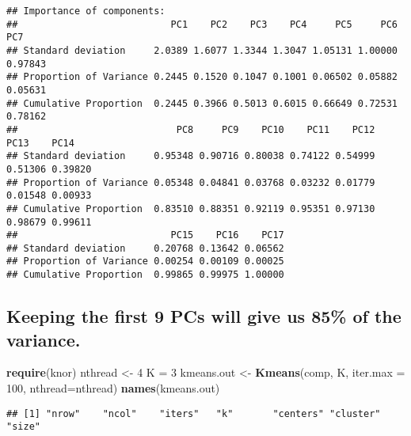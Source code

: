 \documentclass[
]{article}
\newenvironment{Shaded}{\begin{snugshade}}{\end{snugshade}}
\newcommand{\DataTypeTok}[1]{\textcolor[rgb]{0.13,0.29,0.53}{#1}}
\newcommand{\DecValTok}[1]{\textcolor[rgb]{0.00,0.00,0.81}{#1}}
\newcommand{\KeywordTok}[1]{\textcolor[rgb]{0.13,0.29,0.53}{\textbf{#1}}}
\newcommand{\NormalTok}[1]{#1}
\newcommand{\OperatorTok}[1]{\textcolor[rgb]{0.81,0.36,0.00}{\textbf{#1}}}
\newcommand{\StringTok}[1]{\textcolor[rgb]{0.31,0.60,0.02}{#1}}
\begin{document}
\begin{verbatim}
## Importance of components:
##                           PC1    PC2    PC3    PC4     PC5     PC6     PC7
## Standard deviation     2.0389 1.6077 1.3344 1.3047 1.05131 1.00000 0.97843
## Proportion of Variance 0.2445 0.1520 0.1047 0.1001 0.06502 0.05882 0.05631
## Cumulative Proportion  0.2445 0.3966 0.5013 0.6015 0.66649 0.72531 0.78162
##                            PC8     PC9    PC10    PC11    PC12    PC13    PC14
## Standard deviation     0.95348 0.90716 0.80038 0.74122 0.54999 0.51306 0.39820
## Proportion of Variance 0.05348 0.04841 0.03768 0.03232 0.01779 0.01548 0.00933
## Cumulative Proportion  0.83510 0.88351 0.92119 0.95351 0.97130 0.98679 0.99611
##                           PC15    PC16    PC17
## Standard deviation     0.20768 0.13642 0.06562
## Proportion of Variance 0.00254 0.00109 0.00025
## Cumulative Proportion  0.99865 0.99975 1.00000
\end{verbatim}

\hypertarget{keeping-the-first-9-pcs-will-give-us-85-of-the-variance.}{%
\subsection{Keeping the first 9 PCs will give us 85\% of the
variance.}\label{keeping-the-first-9-pcs-will-give-us-85-of-the-variance.}}

\begin{Shaded}
\end{Shaded}

\begin{Shaded}
\begin{Highlighting}[]
\KeywordTok{require}\NormalTok{(knor)}
\NormalTok{nthread <-}\StringTok{ }\DecValTok{4}
\NormalTok{K =}\StringTok{ }\DecValTok{3}
\NormalTok{kmeans.out <-}\StringTok{ }\KeywordTok{Kmeans}\NormalTok{(comp, K, }\DataTypeTok{iter.max =} \DecValTok{100}\NormalTok{, }\DataTypeTok{nthread=}\NormalTok{nthread)}
\KeywordTok{names}\NormalTok{(kmeans.out)}
\end{Highlighting}
\end{Shaded}

\begin{verbatim}
## [1] "nrow"    "ncol"    "iters"   "k"       "centers" "cluster" "size"
\end{verbatim}
\end{document}
